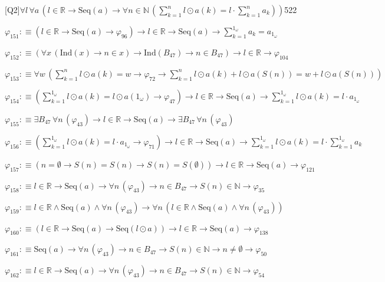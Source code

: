 \begin{fullproof}{[Q2]}{$\forall l\,\forall a\,(l \in \mathbb{R} \to \mathrm{Seq}(a) \to \forall n \in \mathbb{N}\,({\textstyle\sum_{k=1}^{n} l \odot a(k)} = l \cdot {\textstyle\sum_{k=1}^{n} a_{k}}))$}{522}
\begin{abbrevlist}
\item $\varphi_{151} :\equiv (l \in \mathbb{R} \to \mathrm{Seq}(a) \to \varphi_{96}) \to l \in \mathbb{R} \to \mathrm{Seq}(a) \to {\textstyle\sum_{k=1}^{1_{\omega}} a_{k}} = a_{1_{\omega}}$
\item $\varphi_{152} :\equiv (\forall x\,(\mathrm{Ind}(x) \to n \in x) \to \mathrm{Ind}(B_{47}) \to n \in B_{47}) \to l \in \mathbb{R} \to \varphi_{104}$
\item $\varphi_{153} :\equiv \forall w\,({\textstyle\sum_{k=1}^{n} l \odot a(k)} = w \to \varphi_{72} \to {\textstyle\sum_{k=1}^{n} l \odot a(k)} + l \odot a(S(n)) = w + l \odot a(S(n)))$
\item $\varphi_{154} :\equiv ({\textstyle\sum_{k=1}^{1_{\omega}} l \odot a(k)} = l \odot a(1_{\omega}) \to \varphi_{47}) \to l \in \mathbb{R} \to \mathrm{Seq}(a) \to {\textstyle\sum_{k=1}^{1_{\omega}} l \odot a(k)} = l \cdot a_{1_{\omega}}$
\item $\varphi_{155} :\equiv \exists B_{47}\,\forall n\,(\varphi_{43}) \to l \in \mathbb{R} \to \mathrm{Seq}(a) \to \exists B_{47}\,\forall n\,(\varphi_{43})$
\item $\varphi_{156} :\equiv ({\textstyle\sum_{k=1}^{1_{\omega}} l \odot a(k)} = l \cdot a_{1_{\omega}} \to \varphi_{71}) \to l \in \mathbb{R} \to \mathrm{Seq}(a) \to {\textstyle\sum_{k=1}^{1_{\omega}} l \odot a(k)} = l \cdot {\textstyle\sum_{k=1}^{1_{\omega}} a_{k}}$
\item $\varphi_{157} :\equiv (n = \emptyset \to S(n) = S(n) \to S(n) = S(\emptyset)) \to l \in \mathbb{R} \to \mathrm{Seq}(a) \to \varphi_{121}$
\item $\varphi_{158} :\equiv l \in \mathbb{R} \to \mathrm{Seq}(a) \to \forall n\,(\varphi_{43}) \to n \in B_{47} \to S(n) \in \mathbb{N} \to \varphi_{35}$
\item $\varphi_{159} :\equiv l \in \mathbb{R} \land \mathrm{Seq}(a) \land \forall n\,(\varphi_{43}) \to \forall n\,(l \in \mathbb{R} \land \mathrm{Seq}(a) \land \forall n\,(\varphi_{43}))$
\item $\varphi_{160} :\equiv (l \in \mathbb{R} \to \mathrm{Seq}(a) \to \mathrm{Seq}(l \odot a)) \to l \in \mathbb{R} \to \mathrm{Seq}(a) \to \varphi_{138}$
\item $\varphi_{161} :\equiv \mathrm{Seq}(a) \to \forall n\,(\varphi_{43}) \to n \in B_{47} \to S(n) \in \mathbb{N} \to n \neq \emptyset \to \varphi_{50}$
\item $\varphi_{162} :\equiv l \in \mathbb{R} \to \mathrm{Seq}(a) \to \forall n\,(\varphi_{43}) \to n \in B_{47} \to S(n) \in \mathbb{N} \to \varphi_{54}$

\end{abbrevlist}
\end{fullproof}
